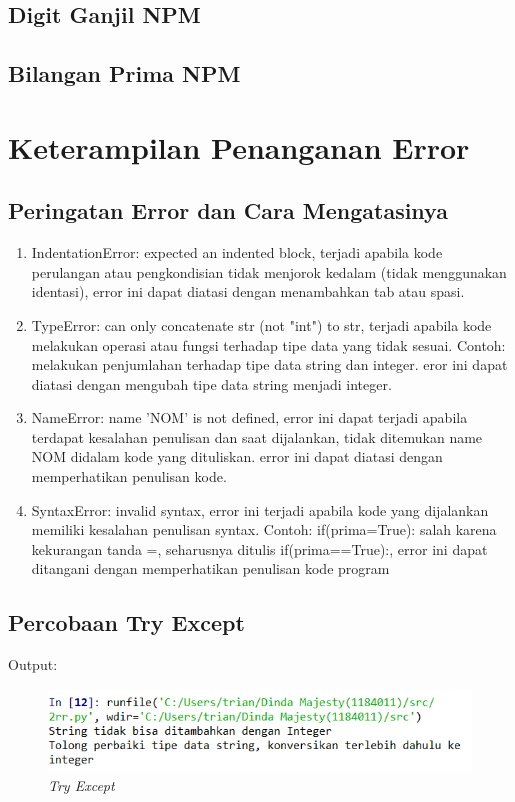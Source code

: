 \subsection{Digit Ganjil NPM}

\subsection{Bilangan Prima NPM}


\section{Keterampilan Penanganan Error}
\subsection{Peringatan Error dan Cara Mengatasinya}
\begin{enumerate}
 \item IndentationError: expected an indented block, terjadi apabila kode perulangan atau pengkondisian tidak menjorok kedalam (tidak menggunakan identasi), error ini dapat diatasi dengan menambahkan tab atau spasi.
 \item TypeError: can only concatenate str (not "int") to str, terjadi apabila kode melakukan operasi atau fungsi terhadap tipe data yang tidak sesuai. Contoh: melakukan penjumlahan terhadap tipe data string dan integer. eror ini dapat diatasi dengan mengubah tipe data string menjadi integer.
 \item NameError: name 'NOM' is not defined, error ini dapat terjadi apabila terdapat kesalahan penulisan dan saat dijalankan, tidak ditemukan name NOM didalam kode yang dituliskan. error ini dapat diatasi dengan memperhatikan penulisan kode. 
 \item SyntaxError: invalid syntax, error ini terjadi apabila kode yang dijalankan memiliki kesalahan penulisan syntax. Contoh: if(prima=True): salah karena kekurangan tanda =, seharusnya ditulis if(prima==True):, error ini dapat ditangani dengan memperhatikan penulisan kode program
\end{enumerate}
\subsection{Percobaan Try Except}

Output:
\begin{figure}[H]
    \centering
    \includegraphics[scale=1]{figures/tryexcept}
    \caption{\textit{Try Except}}
    \label{Try Except}
\end{figure}
